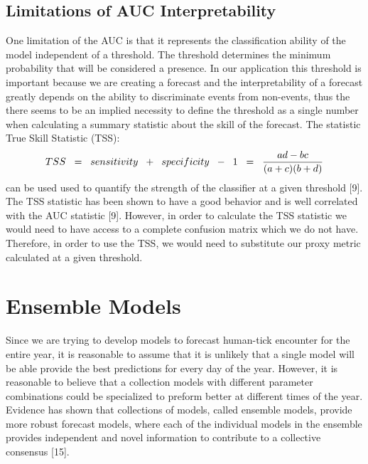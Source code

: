 \subsection{Limitations of AUC Interpretability}
\noindent One limitation of the AUC is that it represents the classification ability of the model independent of a threshold. The threshold determines the minimum probability that will be considered a presence. In our application this threshold is important because we are creating a forecast and the interpretability of a forecast greatly depends on the ability to discriminate events from non-events, thus the there seems to be an implied necessity to define the threshold as a single number when calculating a summary statistic about the skill of the forecast. The statistic True Skill Statistic (TSS):
\begin{equation}
TSS \hspace{0.2cm} = \hspace{0.2cm} sensitivity \hspace{0.2cm} + \hspace{0.2cm} specificity\hspace{0.2cm}  -\hspace{0.2cm} 1 \hspace{0.2cm} =  \hspace{0.2cm} \frac{ad -bc}{(a+c)(b+d)}
\end{equation}
can be used used to quantify the strength of the classifier at a given threshold [9]. The TSS statistic has been shown to have a good behavior and is well correlated with the AUC statistic [9]. However, in order to calculate the TSS statistic we would need to have access to a complete confusion matrix which we do not have. Therefore, in order to use the TSS, we would need to substitute our proxy metric calculated at a given threshold. \newline




\section{Ensemble Models}

Since we are trying to develop models to forecast human-tick encounter for the entire year, it is reasonable to assume that it is unlikely that a single model will be able provide the best predictions for every day of the year. However, it is reasonable to believe that a collection models with different parameter combinations could be specialized to preform better at different times of the year. Evidence has shown that collections of models, called ensemble models, provide more robust forecast models, where each of the individual models in the ensemble provides independent and novel information to contribute to a collective consensus [15]. \newline

